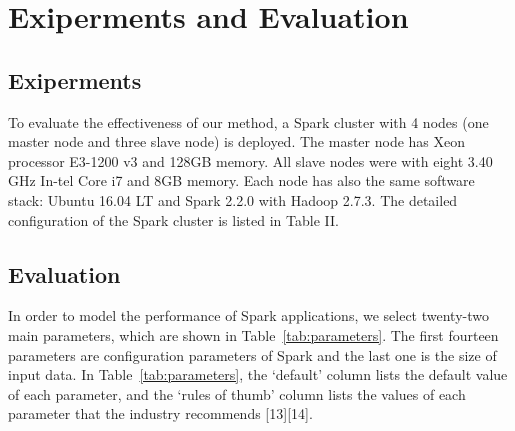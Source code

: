 \section{Exiperments and Evaluation}
\subsection{Exiperments}
\par  To evaluate the effectiveness of our method, a Spark cluster with 4 nodes (one master node and three slave node) is deployed. The master node has Xeon processor E3-1200 v3 and 128GB memory. All slave nodes were with eight 3.40 GHz In-tel Core i7 and 8GB memory. Each node has also the same software stack: Ubuntu 16.04 LT and Spark 2.2.0 with Hadoop 2.7.3. The detailed configuration of the Spark cluster is listed in Table II.

\subsection{Evaluation}
\par In order to model the performance of Spark applications,  we select twenty-two main parameters, which are shown in Table~\ref{tab:parameters}. The first fourteen parameters are configuration parameters of Spark and the last one is the size of input data. In Table~\ref{tab:parameters}, the ‘default' column lists the default value of each parameter, and the ‘rules of thumb’ column lists the values of each parameter that the industry recommends [13][14].